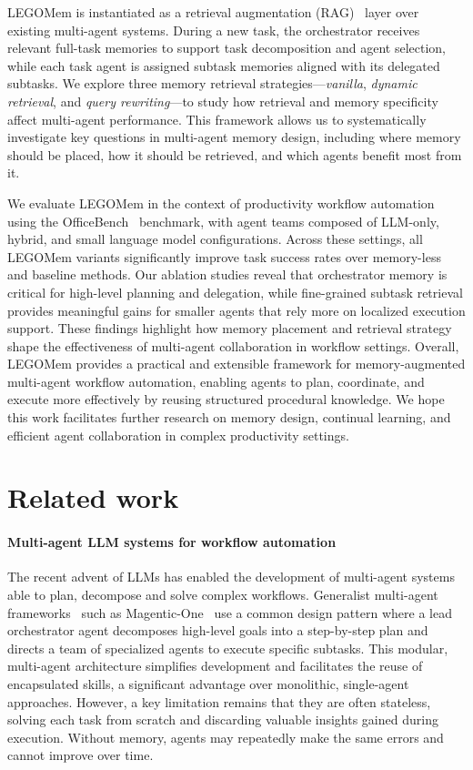 \documentclass[sigconf]{aamas}
\newcommand{\legomem}{LEGOMem}
\begin{document}
\legomem{} is instantiated as a retrieval augmentation (RAG)~\cite{lewis2020retrieval, gao2023retrieval, douze2024faiss} layer over existing multi-agent systems. During a new task, the orchestrator receives relevant full-task memories to support task decomposition and agent selection, while each task agent is assigned subtask memories aligned with its delegated subtasks. We explore three memory retrieval strategies—\textit{vanilla}, \textit{dynamic retrieval}, and \textit{query rewriting}—to study how retrieval and memory specificity affect multi-agent performance.
This framework allows us to systematically investigate key questions in multi-agent memory design, including where memory should be placed, how it should be retrieved, and which agents benefit most from it.

We evaluate \legomem{} in the context of productivity workflow automation using the OfficeBench~\cite{wang2024officebench} benchmark, with agent teams composed of LLM-only, hybrid, and small language model configurations. Across these settings, all \legomem{} variants significantly improve task success rates over memory-less and baseline methods. Our ablation studies reveal that orchestrator memory is critical for high-level planning and delegation, while fine-grained subtask retrieval provides meaningful gains for smaller agents that rely more on localized execution support. These findings highlight how memory placement and retrieval strategy shape the effectiveness of multi-agent collaboration in workflow settings.
Overall, \legomem{} provides a practical and extensible framework for memory-augmented multi-agent workflow automation, enabling agents to plan, coordinate, and execute more effectively by reusing structured procedural knowledge. We hope this work facilitates further research on memory design, continual learning, and efficient agent collaboration in complex productivity settings.


\section{Related work}
\paragraph{Multi-agent LLM systems for workflow automation} 
The recent advent of LLMs has enabled the development of multi-agent systems able to plan, decompose and solve complex workflows.
Generalist multi-agent frameworks~\cite{fourney2024magentic, wu2024autogen, dang2025multi, chen2023agentverse, zhang2024ufo} such as Magentic-One~\cite{fourney2024magentic} use a common design pattern where a lead orchestrator agent decomposes high-level goals into a step-by-step plan and directs a team of specialized agents to execute specific subtasks. This modular, multi-agent architecture simplifies development and facilitates the reuse of encapsulated skills, a significant advantage over monolithic, single-agent approaches.
However, a key limitation remains that they are often stateless, solving each task from scratch and discarding valuable insights gained during execution. Without memory, agents may repeatedly make the same errors and cannot improve over time.
\end{document}

